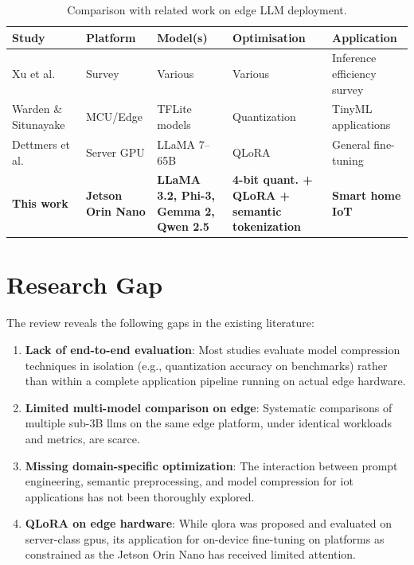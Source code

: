 \documentclass[12pt,a4paper,oneside]{report}
\begin{document}
\begin{table}[htbp]
\caption{Comparison with related work on edge LLM deployment.}
\label{tab:related-work}
\centering
\small
\begin{tabularx}{\textwidth}{p{2.8cm} p{2cm} p{2.5cm} p{2cm} X}
\toprule
\textbf{Study} & \textbf{Platform} & \textbf{Model(s)} & \textbf{Optimisation} & \textbf{Application} \\
\midrule
Xu et al.~\cite{xu2024survey} & Survey & Various & Various & Inference efficiency survey \\
Warden \& Situnayake~\cite{warden2019tinyml} & MCU/Edge & TFLite models & Quantization & TinyML applications \\
Dettmers et al.~\cite{dettmers2023qlora} & Server GPU & LLaMA 7--65B & QLoRA & General fine-tuning \\
\midrule
\textbf{This work} & \textbf{Jetson Orin Nano} & \textbf{LLaMA 3.2, Phi-3, Gemma 2, Qwen 2.5} & \textbf{4-bit quant. + QLoRA + semantic tokenization} & \textbf{Smart home IoT} \\
\bottomrule
\end{tabularx}
\end{table}



\section{Research Gap}
\label{sec:sota-gap}

The review reveals the following gaps in the existing literature:

\begin{enumerate}
    \item \textbf{Lack of end-to-end evaluation}: Most studies evaluate model compression techniques in isolation (e.g., quantization accuracy on benchmarks) rather than within a complete application pipeline running on actual edge hardware.

    \item \textbf{Limited multi-model comparison on edge}: Systematic comparisons of multiple sub-3B \glspl{llm} on the same edge platform, under identical workloads and metrics, are scarce.

    \item \textbf{Missing domain-specific optimization}: The interaction between prompt engineering, semantic preprocessing, and model compression for \gls{iot} applications has not been thoroughly explored.

    \item \textbf{QLoRA on edge hardware}: While \gls{qlora} was proposed and evaluated on server-class \glspl{gpu}, its application for on-device fine-tuning on platforms as constrained as the Jetson Orin Nano has received limited attention.
\end{enumerate}
\end{document}
